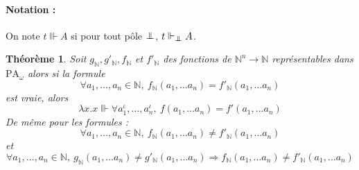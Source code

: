 \documentclass[a4paper,12pt]{article}
\newtheorem{theo}{Théorème}[subsection]
\theoremstyle{rmqstyle}
\newcommand{\N}{\mathbb{N}}
\newcommand{\PA}{\mathrm{PA}}
\renewcommand{\implies}{\Rightarrow}
\newcommand{\pole}{{\protect\mathpalette{\protect\polehelper}{\bot}}} \def\polehelper#1#2{\mathrel{\rlap{$#1#2$}\mkern3mu{#1#2}}}
\begin{document}
\paragraph{Notation :} On note $t \Vvdash A$ si pour tout pôle $\pole$, $t \Vdash_\pole A$.

\begin{theo}
\label{T1}
Soit $g_\N, g'_\N, f_\N$ et  $f'_\N$ des fonctions de $\N^n \to \N$ représentables dans $\PA_\omega$ alors si la formule 
$$\forall a_1, \dots, a_n \in \N, \ f_\N(a_1, \dots a_n) = f'_\N (a_1, \dots a_n)$$
est vraie, alors 
$$\lambda x.x \Vvdash \forall a_1^\iota, \dots, a_n^\iota, \ f(a_1, \dots a_n) = f'(a_1, \dots a_n)$$
De même pour les formules :
$$\forall a_1, \dots, a_n \in \N, \ f_\N(a_1, \dots a_n) \neq f'_\N (a_1, \dots a_n)$$
et
$$\forall a_1, \dots, a_n \in \N, \ g_\N (a_1, \dots a_n) \neq g'_\N (a_1, \dots a_n) \implies f_\N(a_1, \dots a_n) \neq f'_\N (a_1, \dots a_n)$$
\end{theo}
\end{document}
